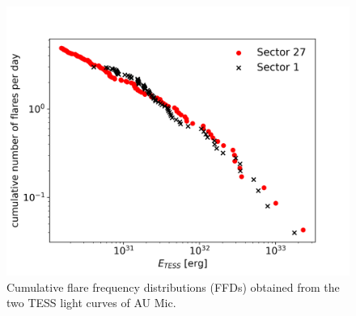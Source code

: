 \documentclass[fleqn,usenatbib,letters]{mnras}%
\begin{document}
\begin{figure}
\includegraphics[width=\hsize]{figures/ffd.png} 
\caption{Cumulative flare frequency distributions (FFDs) obtained from the two TESS light curves of AU Mic.}
\label{fig:ffd}
\end{figure}
\end{document}
